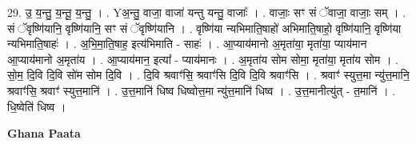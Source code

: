 \documentclass[17pt]{extarticle}
\begin{document}
29. उ॒ य॒न्तु॒ य॒न्तू॒ य॒न्तु॒ । . Yअ॒न्तु॒ वाजा॒ वाजा॑ यन्तु यन्तु॒ वाजाः᳚ । . वाजाः॒ सꣳ सं ॅवाजा॒ वाजाः॒ सम् । . सं ॅवृष्णि॑यानि॒ वृष्णि॑यानि॒ सꣳ सं ॅवृष्णि॑यानि । . वृष्णि॑या न्यभिमाति॒षाहो॑ अभिमाति॒षाहो॒ वृष्णि॑यानि॒ वृष्णि॑या न्यभिमाति॒षाहः॑ । . अ॒भि॒मा॒ति॒षाह॒ इत्य॑भिमाति - साहः॑ । . आ॒प्याय॑मानो अ॒मृता॑या॒ मृता॑या॒ प्याय॑मान आ॒प्याय॑मानो अ॒मृता॑य । . आ॒प्याय॑मान॒ इत्या᳚ - प्याय॑मानः । . अ॒मृता॑य सोम सोमा॒ मृता॑या॒ मृता॑य सोम । . सो॒म॒ दि॒वि दि॒वि सो॑म सोम दि॒वि । . दि॒वि श्रवाꣳ॑सि॒ श्रवाꣳ॑सि दि॒वि दि॒वि श्रवाꣳ॑सि । . श्रवाꣳ॑ स्युत्त॒मा न्यु॑त्त॒मानि॒ श्रवाꣳ॑सि॒ श्रवाꣳ॑ स्युत्त॒मानि॑ । . उ॒त्त॒मानि॑ धिष्व धिष्वोत्त॒मा न्यु॑त्त॒मानि॑ धिष्व । . उ॒त्त॒मानीत्यु॑त् - त॒मानि॑ । . धि॒ष्वेति॑ धिष्व । \newline

\textbf{Ghana Paata } \newline
\end{document}
